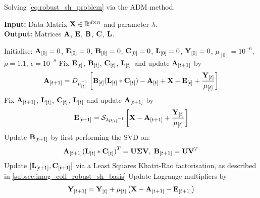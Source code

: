 \begin{algorithm}[t]
    \caption{Solving \cref{eq:robust_sh_problem} via the ADM method.}
\label{alg:imag_coll_adm_solution}
    {\textbf{Input:} Data Matrix $\boldsymbol{\mathbf{X}} \in \mathbb{R}^{d \times n}$ and parameter $\lambda$.} \\
    {\textbf{Output:} Matrices $\boldsymbol{\mathbf{A}}$, $\boldsymbol{\mathbf{E}}$, $\boldsymbol{\mathbf{B}}$, $\boldsymbol{\mathbf{C}}$, $\boldsymbol{\mathbf{L}}$.}  \\
{
    \def\At{{\bb{A}_{[t]}}}
    \def\Et{{\bb{E}_{[t]}}}
    \def\Ct{{\bb{C}_{[t]}}}
    \def\Lt{{\bb{L}_{[t]}}}
    \def\Bt{{\bb{B}_{[t]}}}
    \def\Yt{{\bb{Y}_{[t]}}}
    \def\mut{{\mu_{[t]}}}
    \def\X{{\bb{X}}}
    
    \begin{algorithmic}
        \State{}Initialise: $\boldsymbol{\mathbf{A}}_{[0]} = 0$, $\boldsymbol{\mathbf{E}}_{[0]} = 0$, $\boldsymbol{\mathbf{B}}_{[0]} = 0$, $\boldsymbol{\mathbf{C}}_{[0]} = 0$, $\boldsymbol{\mathbf{L}}_{[0]} = 0$, $\boldsymbol{\mathbf{Y}}_{[0]} = 0$, $\mu_{[0]} = 10^{-6}$, $\rho = 1.1$, $\epsilon = 10^{-8}$
            \State{}Fix $\Et$, $\Bt$, $\Ct$, $\Lt$ and update $\boldsymbol{\mathbf{A}}_{[t + 1]}$ by
                \begin{equation}\label{eq:A_update}
                    \bb{A}_{[t+1]} = D_{\mu_{[t]}^{-1}} \left[  \Bt ( \Lt \ast \Ct ) - \At + \X - \Et + \frac{\Yt}{\mut} \right]
                \end{equation}
            \State{}Fix $\boldsymbol{\mathbf{A}}_{[t+1]}$, $\Lt$, $\Ct$, $\Lt$ and update $\boldsymbol{\mathbf{A}}_{[t + 1]}$ by
                \begin{equation}\label{eq:E_update}
                    \bb{E}_{[t+1]} = \mathcal{S}_{\lambda \mut^{-1}} \left[ \X - \bb{A}_{[t+1]} + \frac{\Yt}{\mut} \right]
                \end{equation}
            \State{}Update $\boldsymbol{\mathbf{B}}_{[t+1]}$ by first performing the SVD on:
                \begin{equation}\label{eq:ALC_svd}
                    \bb{A}_{[t+1]} {(\Lt \ast \Ct)}^T = \bb{U} \bb{\Sigma} \bb{V}, \; \bb{B}_{[t+1]} = \bb{U} \bb{V}^T
                \end{equation}
            \State{}Update $[\boldsymbol{\mathbf{L}}_{[t+1]}, \boldsymbol{\mathbf{C}}_{[t+1]}]$ via a Least Squares Khatri-Rao factorisation, as described in \cref{subsec:imag_coll_robust_sh_basis}
            \State{} Update Lagrange multipliers by
                \begin{equation}\label{eq:Y_update}
                    \bb{Y}_{[t+1]} = \Yt + \mut \left( \X - \bb{A}_{[t+1]} - \bb{E}_{[t+1]} \right)

\end{equation}
\end{algorithmic}}
\end{algorithm}
